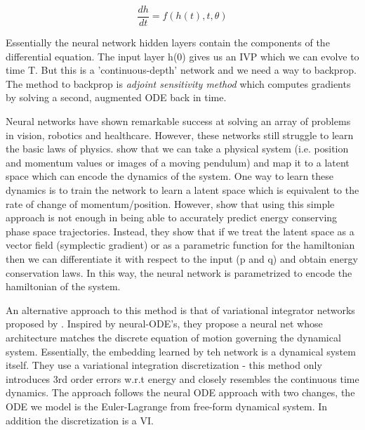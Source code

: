 \documentclass{article}
\begin{document}
$$ \frac{dh}{dt} = f(h(t),t,\theta) $$

Essentially the neural network hidden layers contain the components of the differential equation. The input layer h(0) gives us an IVP which we can evolve to time T. But this is a 'continuous-depth' network and we need a way to backprop. The method to backprop is \textit{adjoint sensitivity method}  which computes gradients by solving a second, augmented ODE back in time. 




Neural networks have shown remarkable success at solving an array of problems in vision, robotics and healthcare. However, these networks still struggle to learn the basic laws of physics. 
\cite{greydanus_hamiltonian_2019} show that we can take a physical system (i.e. position and momentum values or images of a moving pendulum) and map it to a latent space which can encode the dynamics of the system. One way to learn these dynamics is to train the network to learn a latent space which is equivalent to the rate of change of momentum/position. However, \cite{greydanus_hamiltonian_2019} show that using this simple approach is not enough in being able to accurately predict energy conserving phase space trajectories. Instead, they show that if we treat the latent space as a vector field (symplectic gradient) or as a parametric function for the hamiltonian then we can differentiate it with respect to the input (p and q) and obtain energy conservation laws. In this way, the neural network is parametrized to encode the hamiltonian of the system.

An alternative approach to this method is that of variational integrator networks proposed by \cite{saemundsson_variational_2019}. Inspired by neural-ODE's, they propose a neural net whose architecture matches the discrete equation of motion governing the dynamical system. Essentially, the embedding learned by teh network is a dynamical system itself. They use a variational integration discretization - this method only introduces 3rd order errors w.r.t energy and closely resembles the continuous time dynamics. The approach follows the neural ODE approach with two changes, the ODE we model is the Euler-Lagrange from free-form dynamical system. In addition the discretization is a VI. 
\end{document}
